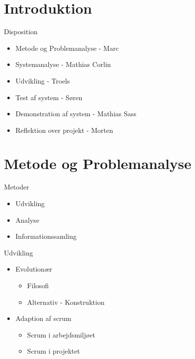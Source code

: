 \section{Introduktion}

\begin{frame}{Disposition}
\begin{itemize}
   \item Metode og Problemanalyse - Marc
   \item Systemanalyse - Mathias Corlin
   \item Udvikling - Troels
   \item Test af system - Søren
   \item Demonstration af system - Mathias Sass
   \item Reflektion over projekt - Morten
\end{itemize}
\end{frame}

\section{Metode og Problemanalyse}

\begin{frame}{Metoder}
\begin{itemize}
   \item Udvikling
   \item Analyse
   \item Informationssamling
\end{itemize}
\end{frame}

\begin{frame}{Udvikling}
\begin{itemize}
   \item Evolutionær
   \begin{itemize}
      \item Filosofi
      \item Alternativ - Konstruktion
   \end{itemize}
   \item Adaption af scrum
   \begin{itemize}
      \item Scrum i arbejdsmiljøet
      \item Scrum i projektet
   \end{itemize}
\end{itemize}
\end{frame}


